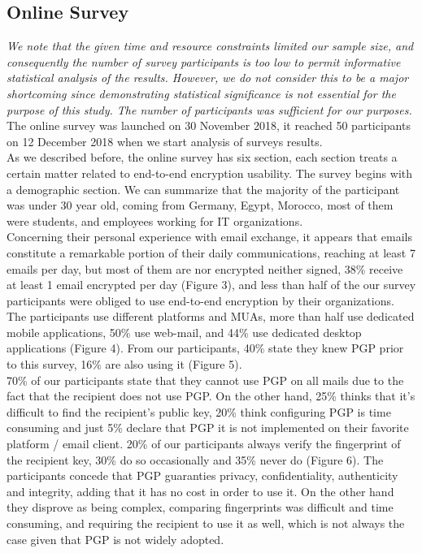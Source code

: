 \subsection{Online Survey}
\textit{We note that the given time and resource constraints limited our sample size, and consequently the number of survey participants is too low to permit informative statistical analysis of the results. However, we do not consider this to be a major shortcoming since demonstrating statistical significance is not essential for the purpose of this study. The number of participants was sufficient for our purposes.}\\
The online survey was launched on 30 November 2018, it reached 50 participants on 12 December 2018 when we start analysis of surveys results.\\
As we described before, the online survey has six section, each section treats a certain matter related to end-to-end encryption usability. The survey begins with a demographic section. We can summarize that the majority of the participant was under 30 year old, coming from Germany, Egypt, Morocco, most of them were students, and employees working for IT organizations.\\
Concerning their personal experience with email exchange, it appears that emails constitute a remarkable portion of their daily communications, reaching at least 7 emails per day, but most of them are nor encrypted neither signed, 38\% receive at least 1 email encrypted per day (Figure 3), and less than half of the our survey participants were obliged to use end-to-end encryption by their organizations.\\
The participants use different platforms and MUAs, more than half use dedicated mobile applications, 50\% use web-mail, and 44\% use dedicated desktop applications (Figure 4).
From our participants, 40\% state they knew PGP prior to this survey, 16\% are also using it (Figure 5).\\
70\% of our participants state that they cannot use PGP on all mails due to the fact that the recipient does not use PGP. On the other hand, 25\% thinks that it’s difficult to find the recipient's public key, 20\% think configuring PGP is time consuming and just 5\% declare that PGP it is not implemented on their favorite platform / email client. 20\% of our participants always verify the fingerprint of the recipient key, 30\% do so occasionally and 35\% never do (Figure 6).
The participants concede that PGP guaranties privacy, confidentiality, authenticity and integrity, adding that it has no cost in order to use it. On the other hand they disprove as being complex, comparing fingerprints was difficult and time consuming, and requiring the recipient to use it as well, which is not always the case given that PGP is not widely adopted.
